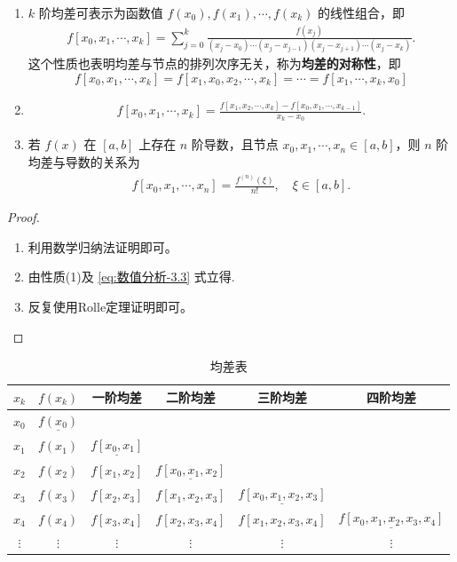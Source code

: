 \documentclass[../../main.tex]{subfiles}%
\begin{document}
\begin{theorem}[均差的基本性质]\label{theorem:均差的基本性质}
\begin{enumerate}[(1)]
\item $k$ 阶均差可表示为函数值 $f(x_0), f(x_1), \cdots, f(x_k)$ 的线性组合，即 
\begin{align}
f[x_0, x_1, \cdots, x_k] = \sum_{j = 0}^k \frac{f(x_j)}{(x_j - x_0) \cdots (x_j - x_{j - 1})(x_j - x_{j + 1}) \cdots (x_j - x_k)}. \label{eq:数值分析-3.4}
\end{align}
这个性质也表明均差与节点的排列次序无关，称为\textbf{均差的对称性}，即 
\[
f[x_0, x_1, \cdots, x_k] = f[x_1, x_0, x_2, \cdots, x_k] = \cdots = f[x_1, \cdots, x_k, x_0]
\]

\item \begin{align}
f[x_0, x_1, \cdots, x_k] = \frac{f[x_1, x_2, \cdots, x_k] - f[x_0, x_1, \cdots, x_{k - 1}]}{x_k - x_0}. \label{eq:数值分析-3.3'}
\end{align}

\item 若 $f(x)$ 在 $[a, b]$ 上存在 $n$ 阶导数，且节点 $x_0, x_1, \cdots, x_n \in [a, b]$，则 $n$ 阶均差与导数的关系为 
\begin{align}
f[x_0, x_1, \cdots, x_n] = \frac{f^{(n)}(\xi)}{n!}, \quad \xi \in [a, b].\label{eq:数值分析-3.5}
\end{align}
\end{enumerate}
\end{theorem}
\begin{proof}
\begin{enumerate}[(1)]
\item 利用数学归纳法证明即可。

\item 由性质(1)及 \eqref{eq:数值分析-3.3} 式立得.

\item 反复使用Rolle定理证明即可。
\end{enumerate}

\end{proof}
\begin{table}[H]
\centering
\caption{均差表}
\label{table:均差表}
\begin{tabular}{c|c|c|c|c|c}
\hline
$x_k$ & $f(x_k)$ & 一阶均差 & 二阶均差 & 三阶均差 & 四阶均差 \\
\hline
$x_0$ & $\underline{f(x_0)}$ &  &  &  &  \\
$x_1$ & $f(x_1)$ & $\underline{f[x_0, x_1]}$ &  &  &  \\
$x_2$ & $f(x_2)$ & $f[x_1, x_2]$ & $\underline{f[x_0, x_1, x_2]}$ &  &  \\
$x_3$ & $f(x_3)$ & $f[x_2, x_3]$ & $f[x_1, x_2, x_3]$ & $\underline{f[x_0, x_1, x_2, x_3]}$ &  \\
$x_4$ & $f(x_4)$ & $f[x_3, x_4]$ & $f[x_2, x_3, x_4]$ & $f[x_1, x_2, x_3, x_4]$ & $\underline{f[x_0, x_1, x_2, x_3, x_4]}$ \\
$\vdots$ & $\vdots$ & $\vdots$ & $\vdots$ & $\vdots$ & $\vdots$ \\
\hline
\end{tabular}
\end{table}
\end{document}
